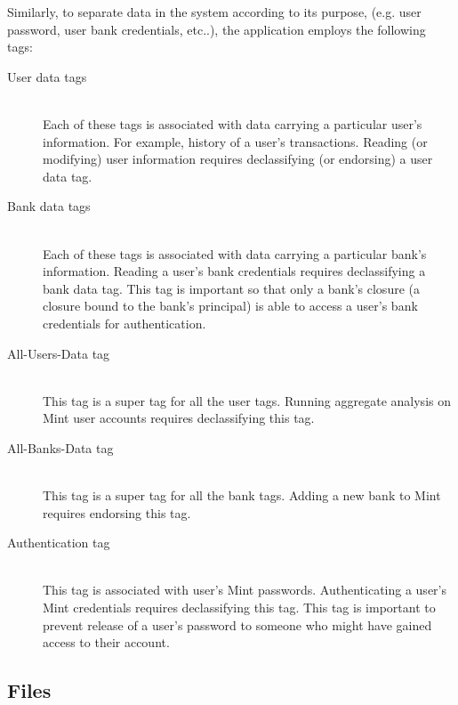Similarly, to separate data in the system according to its purpose, (e.g. user password, user bank credentials, etc..), the application employs the following tags:
\begin{description}
  \item[User data tags] \ \\
    Each of these tags is associated with data 
    carrying a particular user's information.
    For example, history of a user's transactions.
    Reading (or modifying) user information
    requires declassifying (or endorsing)
    a user data tag.
  \item[Bank data tags] \ \\
    Each of these tags is associated 
    with data carrying a particular bank's information.
    Reading a user's bank credentials
    requires declassifying a bank data tag. This tag is
    important so that only a bank's closure (a closure
    bound to the bank's principal) is able
    to access a user's bank credentials for authentication.
  \item[All-Users-Data tag] \ \\ 
    This tag is a super tag for all the user 
    tags.
    Running aggregate analysis on Mint user accounts
    requires declassifying this tag.
  \item[All-Banks-Data tag] \ \\ 
    This tag is a super tag for all the bank tags.
    Adding a new bank to Mint requires endorsing
    this tag.
  \item[Authentication tag] \ \\
    This tag is associated with user's Mint passwords.
    Authenticating a user's Mint credentials
    requires declassifying this tag.
    This tag is important to prevent release of
    a user's password to someone who might have
    gained access to their account.
\end{description}

\subsection{Files}\label{sec:mint-fs}

